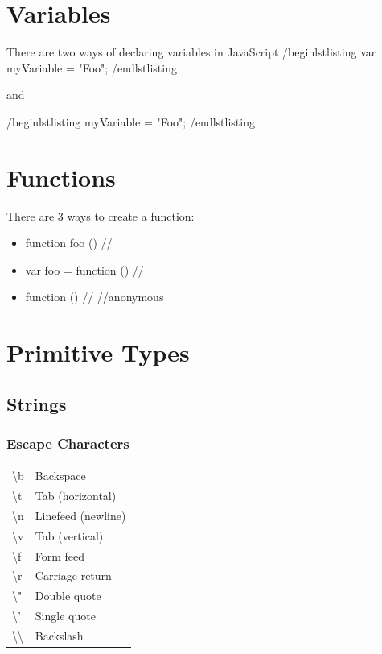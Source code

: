 \documentclass {amsart}
\begin{document}
\section{Variables}
	There are two ways of declaring variables in JavaScript 
	/begin{lstlisting}
		var myVariable = "Foo";
	/end{lstlisting}

	and 

	/begin{lstlisting}
		myVariable = "Foo";
	/end{lstlisting}




\section{Functions}
	There are 3 ways to create a function: 
	\begin{itemize}
		\item function foo () /{/}
		\item var foo = function () /{/}
		\item function () /{/} //anonymous
	\end{itemize}


\section{Primitive Types}
	\subsection{Strings}
			\subsubsection{Escape Characters}

			\begin{center}
			\begin{tabular} {| l |p{5cm}|}
			
				\textbackslash{b} & Backspace \\
				\textbackslash{t} & Tab (horizontal) \\
				\textbackslash{n} & Linefeed (newline) \\
				\textbackslash{v} & Tab (vertical) \\
				\textbackslash{f} & Form feed  \\
				\textbackslash{r} & Carriage return        \\
				\textbackslash{"} & Double quote           \\
				\textbackslash{'} & Single quote           \\
				\textbackslash{}\textbackslash{} & Backslash              \\

			\end{tabular}
			\end{center}
\end{document}

